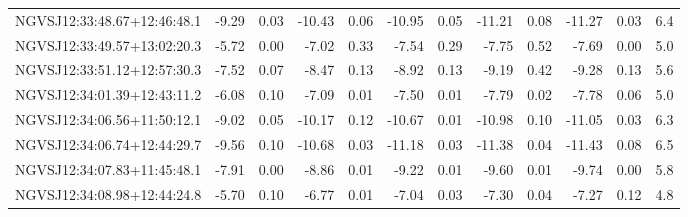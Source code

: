 \begin{tabular}{lrrrrrrrrrrc}
NGVSJ12:33:48.67+12:46:48.1 & -9.29 & 0.03 & -10.43 & 0.06 & -10.95 & 0.05 & -11.21 & 0.08 & -11.27 & 0.03 & 6.4 \\
NGVSJ12:33:49.57+13:02:20.3 & -5.72 & 0.00 & -7.02 & 0.33 & -7.54 & 0.29 & -7.75 & 0.52 & -7.69 & 0.00 & 5.0 \\
NGVSJ12:33:51.12+12:57:30.3 & -7.52 & 0.07 & -8.47 & 0.13 & -8.92 & 0.13 & -9.19 & 0.42 & -9.28 & 0.13 & 5.6 \\
NGVSJ12:34:01.39+12:43:11.2 & -6.08 & 0.10 & -7.09 & 0.01 & -7.50 & 0.01 & -7.79 & 0.02 & -7.78 & 0.06 & 5.0 \\
NGVSJ12:34:06.56+11:50:12.1 & -9.02 & 0.05 & -10.17 & 0.12 & -10.67 & 0.01 & -10.98 & 0.10 & -11.05 & 0.03 & 6.3 \\
NGVSJ12:34:06.74+12:44:29.7 & -9.56 & 0.10 & -10.68 & 0.03 & -11.18 & 0.03 & -11.38 & 0.04 & -11.43 & 0.08 & 6.5 \\
NGVSJ12:34:07.83+11:45:48.1 & -7.91 & 0.00 & -8.86 & 0.01 & -9.22 & 0.01 & -9.60 & 0.01 & -9.74 & 0.00 & 5.8 \\
NGVSJ12:34:08.98+12:44:24.8 & -5.70 & 0.10 & -6.77 & 0.01 & -7.04 & 0.03 & -7.30 & 0.04 & -7.27 & 0.12 & 4.8 \\
\end{tabular}

